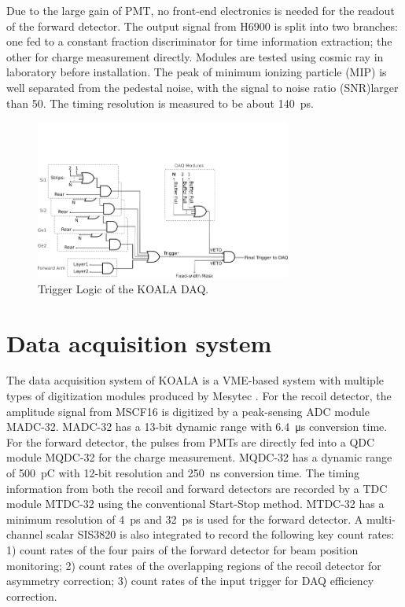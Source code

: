 \documentclass[number,5p]{elsarticle}
\begin{document}
Due to the large gain of PMT, no front-end electronics is needed for the readout of the forward detector.
The output signal from H6900 is split into two branches: one fed to a
constant fraction discriminator for time information extraction; the other for charge measurement directly.
Modules are tested using cosmic ray in laboratory before installation.
The peak of minimum ionizing particle (MIP) is well separated from the pedestal
noise, with the signal to noise ratio (SNR)larger than 50.
The timing resolution is measured to be about \SI{140}{\pico\second}.

\begin{figure}[htbp]
  \centering
  \includegraphics[width=0.75\textwidth]{./trigger_logic.png}
  \caption{Trigger Logic of the KOALA DAQ.}
  \label{fig:trigger_logic}
\end{figure}

\section{Data acquisition system}
\label{sec:daq}

The data acquisition system of KOALA is a VME-based system with multiple types
of digitization modules produced by Mesytec \cite{mesytec}.
For the recoil detector, the amplitude signal from MSCF16 is digitized by a
peak-sensing ADC module MADC-32.
MADC-32 has a 13-bit dynamic range with \SI{6.4}{\micro\second} conversion time.
For the forward detector, the pulses from PMTs are directly fed into a QDC
module MQDC-32 for the charge measurement.
MQDC-32 has a dynamic range of \SI{500}{\pico\coulomb} with 12-bit resolution
and \SI{250}{\nano\second} conversion time.
The timing information from both the recoil and forward detectors are recorded by a TDC module MTDC-32 using the conventional Start-Stop method.
MTDC-32 has a minimum resolution of \SI{4}{\pico\second} and
\SI{32}{\pico\second} is used for the forward detector.
A multi-channel scalar SIS3820 \cite{sis} is also integrated to record
the following key count rates: 1) count rates of the four pairs of the forward detector for beam position monitoring; 2) count rates of the overlapping regions of the recoil detector for asymmetry correction; 3) count rates of the input trigger
for DAQ efficiency correction.
\end{document}
